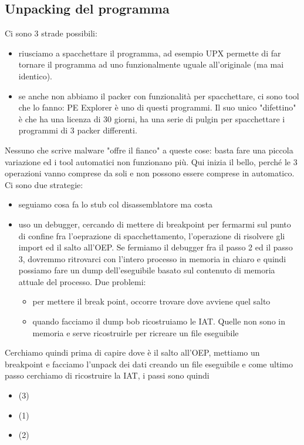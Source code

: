 \documentclass[12pt, oneside]{extbook}
\begin{document}
\subsection{Unpacking del programma}
Ci sono 3 strade possibili:
\begin{itemize}
\item riusciamo a spacchettare il programma, ad esempio UPX permette di far tornare il programma ad uno funzionalmente uguale all'originale (ma mai identico).
\item se anche non abbiamo il packer con funzionalità per spacchettare, ci sono tool che lo fanno: PE Explorer è uno di questi programmi. Il suo unico "difettino" è che ha una licenza di 30 giorni, ha una serie di pulgin per spacchettare i programmi di 3 packer differenti.
\end{itemize}
Nessuno che scrive malware "offre il fianco" a queste cose: basta fare una piccola variazione ed i tool automatici non funzionano più. Qui inizia il bello, perché le 3 operazioni vanno comprese da soli e non possono essere comprese in automatico. Ci sono due strategie:
\begin{itemize}
\item seguiamo cosa fa lo stub col disassemblatore ma costa
\item uso un debugger, cercando di mettere di breakpoint per fermarmi sul punto di confine fra l'oeprazione di spacchettamento, l'operazione di risolvere gli import ed il salto all'OEP. Se fermiamo il debugger fra il passo 2 ed il passo 3, dovremmo ritrovarci con l'intero processo in memoria in chiaro e quindi possiamo fare un dump dell'eseguibile basato sul contenuto di memoria attuale del processo. Due problemi:
\begin{itemize}
\item per mettere il break point, occorre trovare dove avviene quel salto
\item quando facciamo il dump bob ricostruiamo le IAT. Quelle non sono in memoria e serve ricostruirle per ricreare un file eseguibile
\end{itemize}
\end{itemize}
Cerchiamo quindi prima di capire dove è il salto all'OEP, mettiamo un breakpoint e facciamo l'unpack dei dati creando un file eseguibile e come ultimo passo cerchiamo di ricostruire la IAT, i passi sono quindi
\begin{itemize}
\item (3)
\item (1)
\item (2)
\end{itemize}
\end{document}
